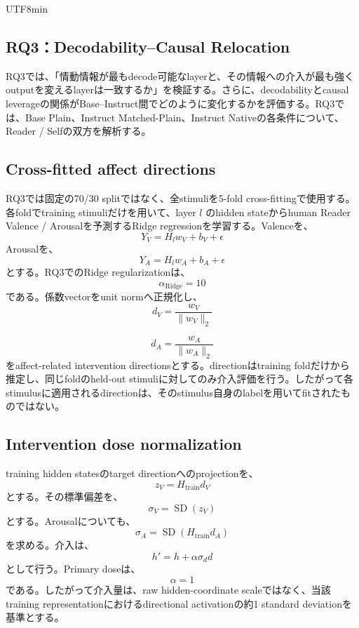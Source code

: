 \documentclass{article} %
\begin{document}
\begin{CJK*}{UTF8}{min}

\subsection{RQ3：Decodability--Causal Relocation}
\label{app:v2-rq3}

RQ3では、「情動情報が最もdecode可能なlayerと、その情報への介入が最も強くoutputを変えるlayerは一致するか」を検証する。さらに、decodabilityとcausal leverageの関係がBase--Instruct間でどのように変化するかを評価する。RQ3では、Base Plain、Instruct Matched-Plain、Instruct Nativeの各条件について、Reader / Selfの双方を解析する。


\subsection{Cross-fitted affect directions}

RQ3では固定の70/30 splitではなく、全stimuliを5-fold cross-fittingで使用する。各foldでtraining stimuliだけを用いて、layer \(l\) のhidden stateからhuman Reader Valence / Arousalを予測するRidge regressionを学習する。Valenceを、
\[
Y_V
=
H_lw_V+b_V+\epsilon
\]
Arousalを、
\[
Y_A
=
H_lw_A+b_A+\epsilon
\]
とする。RQ3でのRidge regularizationは、
\[
\alpha_{\mathrm{Ridge}}=10
\]
である。係数vectorをunit normへ正規化し、
\[
d_V
=
\frac{w_V}{\|w_V\|_2}
\]

\[
d_A
=
\frac{w_A}{\|w_A\|_2}
\]
をaffect-related intervention directionsとする。directionはtraining foldだけから推定し、同じfoldのheld-out stimuliに対してのみ介入評価を行う。したがって各stimulusに適用されるdirectionは、そのstimulus自身のlabelを用いてfitされたものではない。


\subsection{Intervention dose normalization}

training hidden statesのtarget directionへのprojectionを、
\[
z_{V}
=
H_{\mathrm{train}}d_V
\]
とする。その標準偏差を、
\[
\sigma_V
=
\operatorname{SD}(z_V)
\]
とする。Arousalについても、
\[
\sigma_A
=
\operatorname{SD}
(
H_{\mathrm{train}}d_A
)
\]
を求める。介入は、
\[
h'
=
h+\alpha\sigma_d d
\]
として行う。Primary doseは、
\[
\alpha=1
\]
である。したがって介入量は、raw hidden-coordinate scaleではなく、当該training representationにおけるdirectional activationの約1 standard deviationを基準とする。



\end{CJK*}
\end{document}

